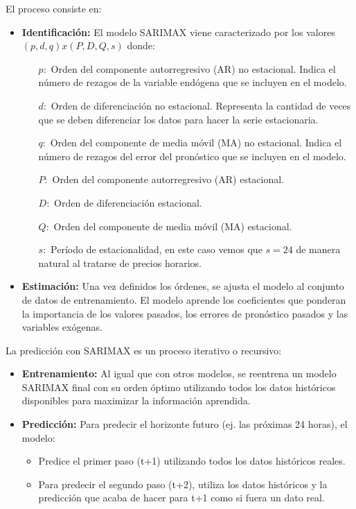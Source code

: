 El proceso consiste en:
\begin{itemize}
    \item \textbf{Identificación:} El modelo SARIMAX viene caracterizado por los valores $(p,d,q)x(P,D,Q,s)$ donde:
        \begin{itemize}
        \item[$p:$] Orden del componente autorregresivo (AR) no estacional. Indica el número de rezagos de la variable endógena que se incluyen en el modelo.
        \item[$d:$] Orden de diferenciación no estacional. Representa la cantidad de veces que se deben diferenciar los datos para hacer la serie estacionaria.
        \item[$q:$] Orden del componente de media móvil (MA) no estacional. Indica el número de rezagos del error del pronóstico que se incluyen en el modelo.
        \item[$P:$] Orden del componente autorregresivo (AR) estacional.
        \item[$D:$] Orden de diferenciación estacional.
        \item[$Q:$] Orden del componente de media móvil (MA) estacional.
        \item[$s:$] Período de estacionalidad, en este caso vemos que $s=24$ de manera natural al tratarse de precios horarios.
    \end{itemize}
    
    \item \textbf{Estimación:} Una vez definidos los órdenes, se ajusta el modelo al conjunto de datos de entrenamiento. El modelo aprende los coeficientes que ponderan la importancia de los valores pasados, los errores de pronóstico pasados y las variables exógenas.
\end{itemize}

La predicción con SARIMAX es un proceso iterativo o recursivo:
\begin{itemize}
    \item \textbf{Entrenamiento:} Al igual que con otros modelos, se reentrena un modelo SARIMAX final con su orden óptimo utilizando todos los datos históricos disponibles para maximizar la información aprendida.
    
    \item \textbf{Predicción:} Para predecir el horizonte futuro (ej. las próximas 24 horas), el modelo:
    \begin{itemize}
        \item Predice el primer paso (t+1) utilizando todos los datos históricos reales.
        \item Para predecir el segundo paso (t+2), utiliza los datos históricos y la predicción que acaba de hacer para t+1 como si fuera un dato real.
    \end{itemize}
\end{itemize}

